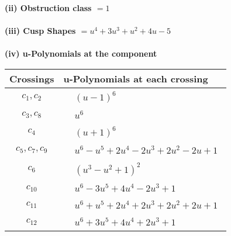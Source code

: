 \documentclass[1p]{elsarticle_modified}
\theoremstyle{definition}
\begin{document}
\flushleft \textbf{(ii) Obstruction class $= 1$}\\~\\
\flushleft \textbf{(iii) Cusp Shapes $= u^4+3 u^3+u^2+4 u-5$}\\~\\
\newpage\renewcommand{\arraystretch}{1}
\flushleft \textbf{(iv) u-Polynomials at the component}\newline \\
\begin{tabular}{m{50pt}|m{274pt}}
Crossings & \hspace{64pt}u-Polynomials at each crossing \\
\hline $$\begin{aligned}c_{1},c_{2}\end{aligned}$$&$\begin{aligned}
&(u-1)^6
\end{aligned}$\\
\hline $$\begin{aligned}c_{3},c_{8}\end{aligned}$$&$\begin{aligned}
&u^6
\end{aligned}$\\
\hline $$\begin{aligned}c_{4}\end{aligned}$$&$\begin{aligned}
&(u+1)^6
\end{aligned}$\\
\hline $$\begin{aligned}c_{5},c_{7},c_{9}\end{aligned}$$&$\begin{aligned}
&u^6- u^5+2 u^4-2 u^3+2 u^2-2 u+1
\end{aligned}$\\
\hline $$\begin{aligned}c_{6}\end{aligned}$$&$\begin{aligned}
&(u^3- u^2+1)^2
\end{aligned}$\\
\hline $$\begin{aligned}c_{10}\end{aligned}$$&$\begin{aligned}
&u^6-3 u^5+4 u^4-2 u^3+1
\end{aligned}$\\
\hline $$\begin{aligned}c_{11}\end{aligned}$$&$\begin{aligned}
&u^6+u^5+2 u^4+2 u^3+2 u^2+2 u+1
\end{aligned}$\\
\hline $$\begin{aligned}c_{12}\end{aligned}$$&$\begin{aligned}
&u^6+3 u^5+4 u^4+2 u^3+1
\end{aligned}$\\
\hline
\end{tabular}\\~\\
\end{document}
